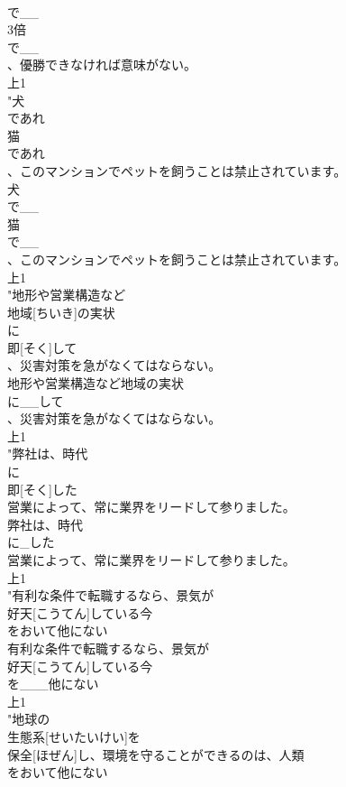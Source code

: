 \documentclass[8pt]{extreport}
\begin{document}
\begin{CJK}{UTF8}{min}
\\	で__
\\	3倍
\\	で__
\\	、優勝できなければ意味がない。
\\	上1
\\	"犬
\\	であれ
\\	猫
\\	であれ
\\	、このマンションでペットを飼うことは禁止されています。
\\	犬
\\	で__
\\	猫
\\	で__
\\	、このマンションでペットを飼うことは禁止されています。
\\	上1
\\	"地形や営業構造など
\\	地域[ちいき]の実状
\\	に
\\	即[そく]して
\\	、災害対策を急がなくてはならない。
\\	地形や営業構造など地域の実状
\\	に__して
\\	、災害対策を急がなくてはならない。
\\	上1
\\	"弊社は、時代
\\	に
\\	即[そく]した
\\	営業によって、常に業界をリードして参りました。
\\	弊社は、時代
\\	に_した
\\	営業によって、常に業界をリードして参りました。
\\	上1
\\	"有利な条件で転職するなら、景気が
\\	好天[こうてん]している今
\\	をおいて他にない
\\	有利な条件で転職するなら、景気が
\\	好天[こうてん]している今
\\	を___他にない
\\	上1
\\	"地球の
\\	生態系[せいたいけい]を
\\	保全[ほぜん]し、環境を守ることができるのは、人類
\\	をおいて他にない

\end{CJK}
\end{document}
